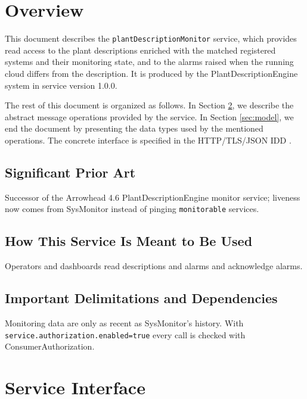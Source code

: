 \documentclass[a4paper]{arrowhead}
\begin{document}
\section{Overview}
\label{sec:overview}

This document describes the \texttt{plant\allowbreak{}Description\allowbreak{}Monitor} service, which provides read access to the plant descriptions enriched with the matched registered systems and their monitoring state, and to the alarms raised when the running cloud differs from the description.
It is produced by the PlantDescriptionEngine system \cite{pde-sysd} in service version 1.0.0.

The rest of this document is organized as follows.
In Section \ref{sec:operations}, we describe the abstract message operations provided by the service.
In Section \ref{sec:model}, we end the document by presenting the data types used by the mentioned operations.
The concrete interface is specified in the HTTP/TLS/JSON IDD \cite{pde-plantDescriptionMonitor-http-idd}.

\subsection{Significant Prior Art}

Successor of the Arrowhead 4.6 Plant\allowbreak{}Description\allowbreak{}Engine monitor service; liveness now comes from SysMonitor instead of pinging \texttt{monitorable} services.

\subsection{How This Service Is Meant to Be Used}

Operators and dashboards read descriptions and alarms and acknowledge alarms.

\subsection{Important Delimitations and Dependencies}
\label{sec:delimitations}

Monitoring data are only as recent as SysMonitor's history. With \texttt{service.\allowbreak{}authorization.\allowbreak{}enabled=\allowbreak{}true} every call is checked with Consumer\allowbreak{}Authorization.

\newpage

\section{Service Interface}
\label{sec:operations}
\end{document}

